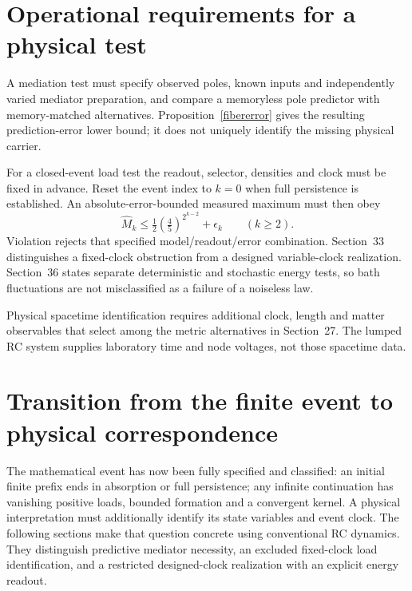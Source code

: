 \documentclass[11pt,letterpaper]{article}
\theoremstyle{definition}
\numberwithin{equation}{section}
\begin{document}
\section{Operational requirements for a physical test}
A mediation test must specify observed poles, known inputs and independently varied mediator preparation, and compare a memoryless pole predictor with memory-matched alternatives. Proposition~\ref{fibererror} gives the resulting prediction-error lower bound; it does not uniquely identify the missing physical carrier.

For a closed-event load test the readout, selector, densities and clock must be fixed in advance. Reset the event index to $k=0$ when full persistence is established. An absolute-error-bounded measured maximum must then obey
\begin{equation}
\widehat M_k\leq\tfrac12(\tfrac45)^{2^{k-2}}+\epsilon_k\qquad(k\geq2).
\end{equation}
Violation rejects that specified model/readout/error combination. Section~33 distinguishes a fixed-clock obstruction from a designed variable-clock realization. Section~36 states separate deterministic and stochastic energy tests, so bath fluctuations are not misclassified as a failure of a noiseless law.

Physical spacetime identification requires additional clock, length and matter observables that select among the metric alternatives in Section~27. The lumped RC system supplies laboratory time and node voltages, not those spacetime data.

\section{Transition from the finite event to physical correspondence}
The mathematical event has now been fully specified and classified: an initial finite prefix ends in absorption or full persistence; any infinite continuation has vanishing positive loads, bounded formation and a convergent kernel. A physical interpretation must additionally identify its state variables and event clock. The following sections make that question concrete using conventional RC dynamics. They distinguish predictive mediator necessity, an excluded fixed-clock load identification, and a restricted designed-clock realization with an explicit energy readout.
\end{document}
